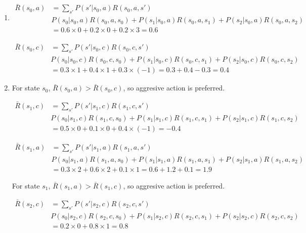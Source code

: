 \documentclass[12pt, xcolor=dvipsnames,svgnames,x11names]{article}
\begin{document}
\begin{enumerate}

\item 


\begin{align*}
\bar{R}(s_0, a) & = \sum_{s'} P(s'|s_0,a)R(s_0,a,s')\\
				& P(s_0|s_0,a)R(s_0,a,s_0) + P(s_1|s_0,a)R(s_0,a,s_1) + P(s_2|s_0,a)R(s_0,a,s_2)\\
				& =  0.6\times 0 + 0.2 \times 0 + 0.2 \times 3 = 0.6
\end{align*}

\begin{align*}
\bar{R}(s_0, c) & = \sum_{s'} P(s'|s_0,c)R(s_0,c,s')\\
				& P(s_0|s_0,c)R(s_0,c,s_0) + P(s_1|s_0,c)R(s_0,c,s_1) + P(s_2|s_0,c)R(s_0,c,s_2)\\
				& =  0.3\times 1 + 0.4 \times 1 + 0.3 \times (-1) = 0.3 + 0.4 - 0.3 = 0.4
\end{align*}


\item 

For state $s_0$, $\bar{R}(s_0, a) > \bar{R}(s_0, c)$, so aggresive action is preferred. 

\begin{align*}
\bar{R}(s_1, c) & = \sum_{s'} P(s'|s_1,c)R(s_1,c,s')\\
				& P(s_0|s_1,c)R(s_1,c,s_0) + P(s_1|s_1,c)R(s_1,c,s_1) + P(s_2|s_1,c)R(s_1,c,s_2)\\
				& =  0.5\times0 + 0.1\times0 + 0.4\times(-1)  = -0.4
\end{align*}

\begin{align*}
\bar{R}(s_1, a) & = \sum_{s'} P(s'|s_1,a)R(s_1,a,s')\\
				& P(s_0|s_1,a)R(s_1,a,s_0) + P(s_1|s_1,a)R(s_1,a,s_1) + P(s_2|s_1,a)R(s_1,a,s_2)\\
				& =   0.3\times 2 + 0.6\times 2 + 0.1\times 1 = 0.6 + 1.2 + 0.1 = 1.9
\end{align*}

For state $s_1$, $\bar{R}(s_1, a) > \bar{R}(s_1, c)$, so aggresive action is preferred. 



\begin{align*}
\bar{R}(s_2, c) & = \sum_{s'} P(s'|s_2,c)R(s_2,c,s')\\
				& P(s_0|s_2,c)R(s_2,c,s_0) + P(s_1|s_2,c)R(s_2,c,s_1) + P(s_2|s_2,c)R(s_2,c,s_2)\\
				& =   0.2\times 0 + 0.8\times 1 = 0.8 
\end{align*}



\end{enumerate}
\end{document}
